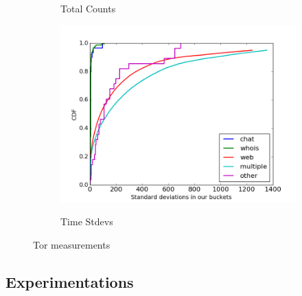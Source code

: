 \begin{figure}
\begin{subfigure}[t]{0.32\textwidth}
		\label{fig:stats_b}
		\caption{Total Counts}
	\end{subfigure}
	\begin{subfigure}[t]{0.32\textwidth} \centering
\includegraphics[scale=0.3]{images/stddevs.png}
		\label{fig:stats_c}
		\caption{Time Stdevs}
	\end{subfigure}
	\label{fig:measurements}
	\caption{Tor measurements}
\end{figure}

\subsection{Experimentations}